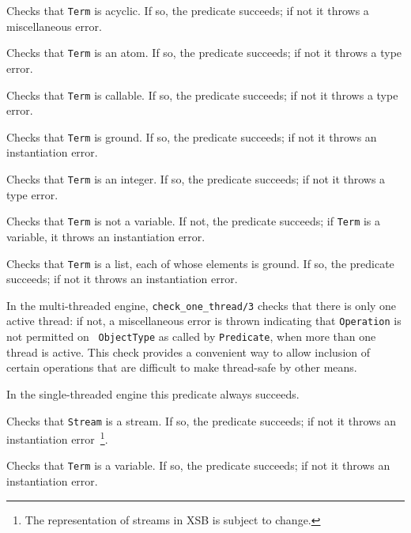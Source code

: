 \begin{description}
%
Checks that {\tt Term} is acyclic.  If so, the predicate succeeds;
if not it throws a miscellaneous error.

%
Checks that {\tt Term} is an atom.  If so, the predicate succeeds;
if not it throws a type error.

%
Checks that {\tt Term} is callable.  If so, the predicate succeeds; if
not it throws a type error.

%
Checks that {\tt Term} is ground.  If so, the predicate succeeds;
if not it throws an instantiation error.

%
Checks that {\tt Term} is an integer.  If so, the predicate succeeds;
if not it throws a type error.

%
Checks that {\tt Term} is not a variable.  If not, the predicate succeeds;
if {\tt Term} is a variable,  it throws an instantiation error.

%
Checks that {\tt Term} is a list, each of whose elements is ground.
If so, the predicate succeeds; if not it throws an instantiation
error.
	    
%
In the multi-threaded engine, {\tt check\_one\_thread/3} checks that
there is only one active thread: if not, a miscellaneous error is
thrown indicating that {\tt Operation} is not permitted on {\tt
  ObjectType} as called by {\tt Predicate}, when more than one thread
is active.  This check provides a convenient way to allow inclusion of
certain operations that are difficult to make thread-safe by other
means.

In the single-threaded engine this predicate always succeeds.

%
Checks that {\tt Stream} is a stream.  If so, the predicate succeeds;
if not it throws an instantiation error~\footnote{The representation
of streams in XSB is subject to change.}.

%
Checks that {\tt Term} is a variable.  If so, the predicate succeeds;
if not it throws an instantiation error.

\end{description}

